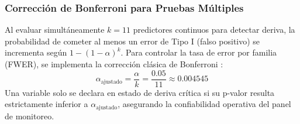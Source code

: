 \subsubsection{Corrección de Bonferroni para Pruebas Múltiples}
Al evaluar simultáneamente $k = 11$ predictores continuos para detectar deriva, la probabilidad de cometer al menos un error de Tipo I (falso positivo) se incrementa según $1 - (1 - \alpha)^k$. Para controlar la tasa de error por familia (FWER), se implementa la corrección clásica de Bonferroni \citep{bonferroni1936teoria}:
\begin{equation}
    \alpha_{\text{ajustado}} = \frac{\alpha}{k} = \frac{0.05}{11} \approx 0.004545
    \label{eq:bonferroni}
\end{equation}
Una variable solo se declara en estado de deriva crítica si su p-valor resulta estrictamente inferior a $\alpha_{\text{ajustado}}$, asegurando la confiabilidad operativa del panel de monitoreo.
